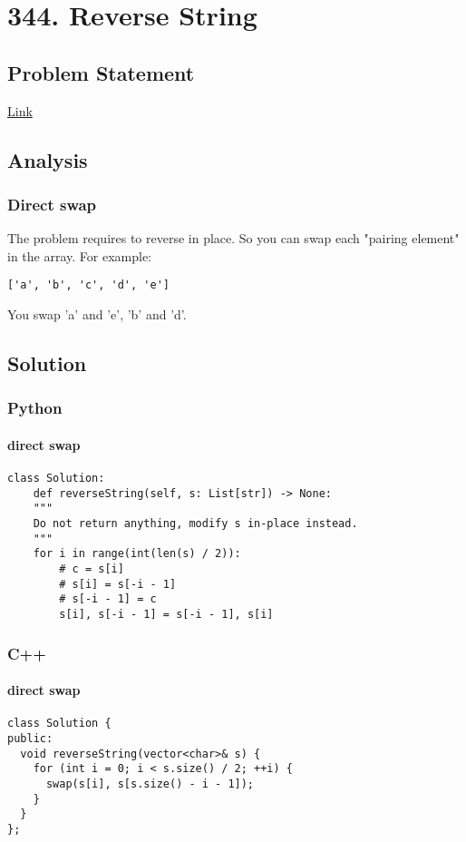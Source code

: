 \documentclass[12pt]{article}
\begin{document}
\section{344. Reverse String}
\label{sec:orgd683ef6}
\subsection{Problem Statement}
\label{sec:orgfe82525}
\href{https://leetcode.com/problems/reverse-string/}{Link}
\subsection{Analysis}
\label{sec:orgc194350}
\subsubsection{Direct swap}
\label{sec:org4516c25}
The problem requires to reverse in place. So you can swap each "pairing element" in the array. For example:
\begin{verbatim}
['a', 'b', 'c', 'd', 'e']
\end{verbatim}
You swap 'a' and 'e', 'b' and 'd'.

\subsection{Solution}
\label{sec:orgeaab557}
\subsubsection{Python}
\label{sec:orgfe93a2c}
\paragraph{direct swap}
\label{sec:org369b345}
\begin{verbatim}
class Solution:
    def reverseString(self, s: List[str]) -> None:
	"""
	Do not return anything, modify s in-place instead.
	"""
	for i in range(int(len(s) / 2)):
	    # c = s[i]
	    # s[i] = s[-i - 1]
	    # s[-i - 1] = c
	    s[i], s[-i - 1] = s[-i - 1], s[i]
\end{verbatim}
\subsubsection{C++}
\label{sec:orgbd548eb}
\paragraph{direct swap}
\label{sec:orgdc4c9a4}
\begin{verbatim}
class Solution {
public:
  void reverseString(vector<char>& s) {
    for (int i = 0; i < s.size() / 2; ++i) {
      swap(s[i], s[s.size() - i - 1]);
    }
  }
};
\end{verbatim}
\end{document}
